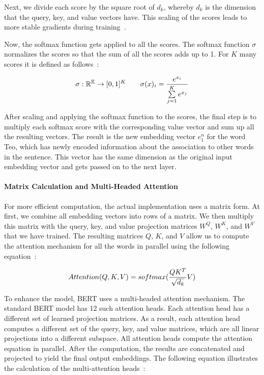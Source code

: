 Next, we divide each score by the square root of $d_k$, whereby $d_k$ is the dimension that the query, key, and value vectors have. This scaling of the scores leads to more stable gradients during training~\cite{vaswani2017attention}.

Now, the softmax function gets applied to all the scores. The softmax function $\sigma$ normalizes the scores so that the sum of all the scores adds up to 1. For $K$ many scores it is defined as follows~\cite{softmax}:

\begin{equation}
\setlength{\jot}{25pt}
    \begin{aligned}
    \sigma : \mathbb{R^K} \rightarrow [0,1]^K  \quad\quad
      \sigma(x)_i=\frac{e^{x_i}}
      {\sum\limits_{j=1}^K e^{x_j}}
    \end{aligned}
    \label{equation:softmax}
\end{equation}

After scaling and applying the softmax function to the scores, the final step is to multiply each softmax score with the corresponding value vector and sum up all the resulting vectors. The result is the new embedding vector $e^n_1$ for the word Teo, which has newly encoded information about the association to other words in the sentence. This vector has the same dimension as the original input embedding vector and gets passed on to the next layer.

\paragraph{Matrix Calculation and Multi-Headed Attention}
For more efficient computation, the actual implementation uses a matrix form. At first, we combine all embedding vectors into rows of a matrix. We then multiply this matrix with the query, key, and value projection matrices $W^Q$, $W^K$, and $W^V$ that we have trained. The resulting matrices $Q$, $K$, and $V$ allow us to compute the attention mechanism for all the words in parallel using the following equation~\cite{vaswani2017attention}:

\begin{equation}
\setlength{\jot}{25pt}
    \begin{aligned}
        Attention(Q,K,V)=softmax(\frac{QK^T}{\sqrt{d_k}}V)
    \end{aligned}
    \label{equation:self_attention}
\end{equation}

To enhance the model, BERT uses a multi-headed attention mechanism. The standard BERT model has 12 such attention heads. Each attention head has a different set of learned projection matrices. As a result, each attention head computes a different set of the query, key, and value matrices, which are all linear projections into a different subspace. All attention heads compute the attention equation in parallel. After the computation, the results are concatenated and projected to yield the final output embeddings. The following equation illustrates the calculation of the multi-attention heads~\cite{vaswani2017attention}: 

